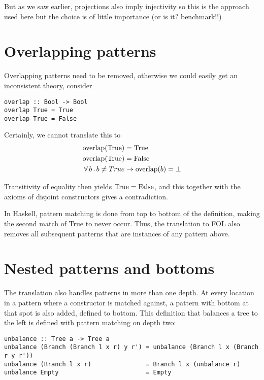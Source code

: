 But as we saw earlier, projections also imply injectivity so this is
the approach used here but the choice is of little importance (or is
it? benchmark!!)

\section{Overlapping patterns}

Overlapping patterns need to be removed, otherwise we could easily get
an inconsistent theory, consider

\begin{verbatim}
overlap :: Bool -> Bool
overlap True = True
overlap True = False
\end{verbatim}

Certainly, we cannot translate this to
\begin{align*}
\mathrm{overlap}(\mathrm{True}) & = \mathrm{True} \\
\mathrm{overlap}(\mathrm{True}) & = \mathrm{False} \\
\forall \, b \, . \, b \neq True & \rightarrow \mathrm{overlap}(b) = \bot
\end{align*}

Transitivity of equality then yields $\mathrm{True} = \mathrm{False}$,
and this together with the axioms of disjoint constructors gives a
contradiction.

In Haskell, pattern matching is done from top to bottom of the
definition, making the second match of True to never occur. Thus, the
translation to FOL also removes all subsequent patterns that are
instances of any pattern above.

\section{Nested patterns and bottoms}

The translation also handles patterns in more than one depth. At every
location in a pattern where a constructor is matched against, a
pattern with bottom at that spot is also added, defined to
bottom. This definition that balances a tree to the left is defined
with pattern matching on depth two:

\begin{verbatim}
unbalance :: Tree a -> Tree a
unbalance (Branch (Branch l x r) y r') = unbalance (Branch l x (Branch r y r'))
unbalance (Branch l x r)               = Branch l x (unbalance r)
unbalance Empty                        = Empty
\end{verbatim}

